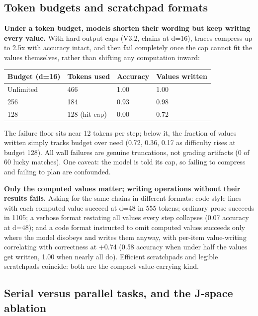 \subsection{Token budgets and scratchpad
formats}\label{token-budgets-and-scratchpad-formats}

\textbf{Under a token budget, models shorten their wording but keep
writing every value.} With hard output caps (V3.2, chains at d=16),
traces compress up to 2.5x with accuracy intact, and then fail
completely once the cap cannot fit the values themselves, rather than
shifting any computation inward:

\begin{table}[t]\centering\small
\begin{tabular}{llll}
\toprule
Budget (d=16) & Tokens used & Accuracy & Values written \\
\midrule



Unlimited & 466 & 1.00 & 1.00 \\
256 & 184 & 0.93 & 0.98 \\
128 & 128 (hit cap) & 0.00 & 0.72 \\
\bottomrule
\end{tabular}
\end{table}

The failure floor sits near 12 tokens per step; below it, the fraction
of values written simply tracks budget over need (0.72, 0.36, 0.17 as
difficulty rises at budget 128). All wall failures are genuine
truncations, not grading artifacts (0 of 60 lucky matches). One caveat:
the model is told its cap, so failing to compress and failing to plan
are confounded.

\textbf{Only the computed values matter; writing operations without
their results fails.} Asking for the same chains in different formats:
code-style lines with each computed value succeed at d=48 in 555 tokens;
ordinary prose succeeds in 1105; a verbose format restating all values
every step collapses (0.07 accuracy at d=48); and a code format
instructed to omit computed values succeeds only where the model
disobeys and writes them anyway, with per-item value-writing correlating
with correctness at +0.74 (0.58 accuracy when under half the values get
written, 1.00 when nearly all do). Efficient scratchpads and legible
scratchpads coincide: both are the compact value-carrying kind.

\subsection{Serial versus parallel tasks, and the J-space
ablation}\label{serial-versus-parallel-tasks-and-the-j-space-ablation}


